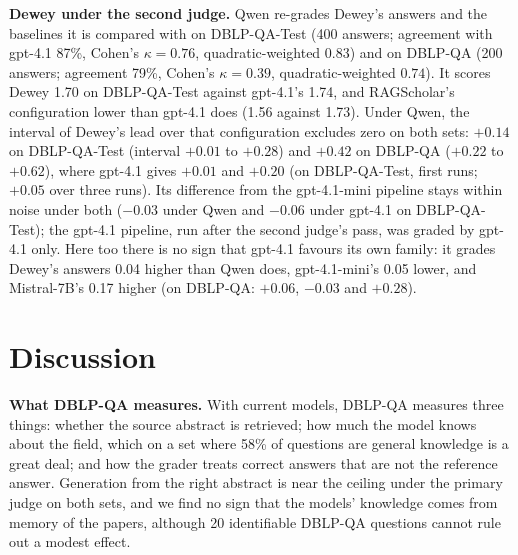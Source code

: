 \documentclass[conference]{IEEEtran}
\newcommand{\dq}{DBLP-QA}
\newcommand{\test}{DBLP-QA-Test}
\begin{document}
\textbf{Dewey under the second judge.} Qwen re-grades Dewey's answers and the baselines it is compared
with on \test{} (400 answers; agreement with gpt-4.1 87\%, Cohen's $\kappa=0.76$, quadratic-weighted
$0.83$) and on \dq{} (200 answers; agreement 79\%, Cohen's $\kappa=0.39$, quadratic-weighted $0.74$). It scores Dewey 1.70 on \test{}
against gpt-4.1's 1.74, and RAGScholar's configuration lower than gpt-4.1 does (1.56 against 1.73). Under
Qwen, the interval of Dewey's lead over that configuration excludes zero on both sets: $+0.14$ on \test{} (interval
$+0.01$ to $+0.28$) and $+0.42$ on \dq{} ($+0.22$ to $+0.62$), where gpt-4.1 gives $+0.01$ and $+0.20$ (on \test{}, first runs; $+0.05$ over three runs).
Its difference from the gpt-4.1-mini pipeline stays within noise under both ($-0.03$ under Qwen and $-0.06$ under gpt-4.1 on
\test{}); the gpt-4.1 pipeline, run after the second judge's pass, was graded by gpt-4.1 only. Here too there is no sign that gpt-4.1 favours its own family: it grades Dewey's answers
0.04 higher than Qwen does, gpt-4.1-mini's 0.05 lower, and Mistral-7B's 0.17 higher (on \dq{}: $+0.06$, $-0.03$ and $+0.28$).

\section{Discussion}

\textbf{What \dq{} measures.} With current models, \dq{} measures three things: whether the source
abstract is retrieved; how much the model knows about the field, which on a set where 58\% of questions
are general knowledge is a great deal; and how the grader treats correct answers that are not the
reference answer. Generation from the right abstract is near the ceiling under the primary judge on both
sets, and we find no sign that the models' knowledge comes from memory of the papers, although 20
identifiable \dq{} questions cannot rule out a modest effect.
\end{document}
